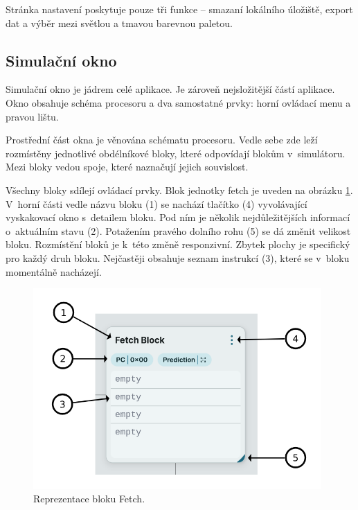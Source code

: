 
Stránka nastavení poskytuje pouze tři funkce -- smazaní lokálního úložiště, export dat a výběr mezi světlou a tmavou barevnou paletou.

\subsection{Simulační okno}
\label{simWindow}


Simulační okno je jádrem celé aplikace.
Je zároveň nejsložitější částí aplikace.
Okno obsahuje schéma procesoru a dva samostatné prvky: horní ovládací menu a pravou lištu.

Prostřední část okna je věnována schématu procesoru.
Vedle sebe zde leží rozmístěny jednotlivé obdélníkové bloky, které odpovídají blokům v~simulátoru.
Mezi bloky vedou spoje, které naznačují jejich souvislost.

Všechny bloky sdílejí ovládací prvky.
Blok jednotky fetch je uveden na obrázku \ref{simblock_figure}.
V~horní části vedle názvu bloku (1) se nachází tlačítko (4) vyvolávající vyskakovací okno s~detailem bloku.
Pod ním je několik nejdůležitějších informací o~aktuálním stavu (2).
Potažením pravého dolního rohu (5) se dá změnit velikost bloku.
Rozmístění bloků je k~této změně responzivní.
Zbytek plochy je specifický pro každý druh bloku.
Nejčastěji obsahuje seznam instrukcí (3), které se v~bloku momentálně nacházejí.

\begin{figure}[hbtp]
    \begin{center}
        \includegraphics[width=11cm]{obrazky-figures/impl/simblock.png}
    \end{center}
    \caption{Reprezentace bloku Fetch.}
    \label{simblock_figure}
\end{figure}

